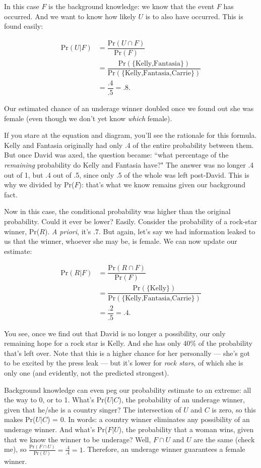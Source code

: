 In this case $F$ is the background knowledge: we know that the event $F$
has occurred. And we want to know how likely $U$ is to also have occurred.
This is found easily:

\begin{align*}
\text{Pr}(U|F) &= \dfrac{\text{Pr}(U \cap F)}{\text{Pr}(F)} \\
&= \dfrac{\text{Pr}(\{\text{Kelly,Fantasia}\})}{\text{Pr}(\{\text{Kelly,Fantasia,Carrie}\})}
\\
&= \dfrac{.4}{.5} = .8.
\end{align*}

Our estimated chance of an underage winner doubled once we found out she
was female (even though we don't yet know \textit{which} female).

If you stare at the equation and diagram, you'll see the rationale for this
formula. Kelly and Fantasia originally had only .4 of the entire
probability between them. But once David was axed, the question became:
``what percentage of the \textit{remaining} probability do Kelly and
Fantasia have?" The answer was no longer .4 out of 1, but .4 out of .5,
since only .5 of the whole was left post-David. This is why we divided by
Pr($F$): that's what we know remains given our background fact.

Now in this case, the conditional probability was higher than the original
probability. Could it ever be lower? Easily. Consider the probability of a
rock-star winner, Pr($R$). \textit{A priori}, it's .7. But again, let's say
we had information leaked to us that the winner, whoever she may be, is
female. We can now update our estimate:

\begin{align*}
\text{Pr}(R|F) &= \dfrac{\text{Pr}(R \cap F)}{\text{Pr}(F)} \\
&= \dfrac{\text{Pr}(\{\text{Kelly}\})}{\text{Pr}(\{\text{Kelly,Fantasia,Carrie}\})}
\\
&= \dfrac{.2}{.5} = .4.
\end{align*}

You see, once we find out that David is no longer a possibility, our only
remaining hope for a rock star is Kelly. And she has only 40\% of the
probability that's left over. Note that this is a higher chance for
her personally --- she's got to be excited by the press leak --- but it's
lower for \textit{rock stars}, of which she is only one (and evidently, not
the predicted strongest).

Background knowledge can even peg our probability estimate to an extreme:
all the way to 0, or to 1. What's Pr($U|C$), the probability of an underage
winner, given that he/she is a country singer? The intersection of $U$ and
$C$ is zero, so this makes Pr($U|C$) = 0. In words: a country winner
eliminates any possibility of an underage winner. And what's Pr($F|U$), the
probability that a woman wins, given that we know the winner to be
underage? Well, $F \cap U$ and $U$ are the same (check me), so
$\frac{\text{Pr}(F \cap U)}{\text{Pr}(U)} = \frac{.4}{.4} = 1$. Therefore,
an underage winner guarantees a female winner.

